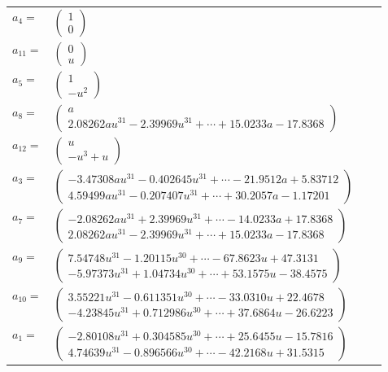 \documentclass[1p]{elsarticle_modified}
\theoremstyle{definition}
\begin{document}
\begin{tabular}{m{7pt} m{180pt} m{7pt} m{180pt} }
\flushright $a_{4}=$&$\begin{pmatrix}1\\0\end{pmatrix}$ \\
\flushright $a_{11}=$&$\begin{pmatrix}0\\u\end{pmatrix}$ \\
\flushright $a_{5}=$&$\begin{pmatrix}1\\- u^2\end{pmatrix}$ \\
\flushright $a_{8}=$&$\begin{pmatrix}a\\2.08262 a u^{31}-2.39969 u^{31}+\cdots+15.0233 a-17.8368\end{pmatrix}$ \\
\flushright $a_{12}=$&$\begin{pmatrix}u\\- u^3+u\end{pmatrix}$ \\
\flushright $a_{3}=$&$\begin{pmatrix}-3.47308 a u^{31}-0.402645 u^{31}+\cdots-21.9512 a+5.83712\\4.59499 a u^{31}-0.207407 u^{31}+\cdots+30.2057 a-1.17201\end{pmatrix}$ \\
\flushright $a_{7}=$&$\begin{pmatrix}-2.08262 a u^{31}+2.39969 u^{31}+\cdots-14.0233 a+17.8368\\2.08262 a u^{31}-2.39969 u^{31}+\cdots+15.0233 a-17.8368\end{pmatrix}$ \\
\flushright $a_{9}=$&$\begin{pmatrix}7.54748 u^{31}-1.20115 u^{30}+\cdots-67.8623 u+47.3131\\-5.97373 u^{31}+1.04734 u^{30}+\cdots+53.1575 u-38.4575\end{pmatrix}$ \\
\flushright $a_{10}=$&$\begin{pmatrix}3.55221 u^{31}-0.611351 u^{30}+\cdots-33.0310 u+22.4678\\-4.23845 u^{31}+0.712986 u^{30}+\cdots+37.6864 u-26.6223\end{pmatrix}$ \\
\flushright $a_{1}=$&$\begin{pmatrix}-2.80108 u^{31}+0.304585 u^{30}+\cdots+25.6455 u-15.7816\\4.74639 u^{31}-0.896566 u^{30}+\cdots-42.2168 u+31.5315\end{pmatrix}$ \\

\end{tabular}
\end{document}
